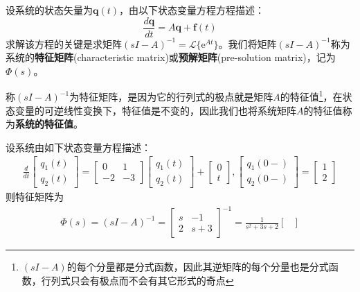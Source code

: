 \begin{definition}
    设系统的状态矢量为$\mathbf{q}(t)$，由以下状态变量方程方程描述：
    $$\frac{d\mathbf{q}}{dt}=A\mathbf{q}+\mathbf{f}(t)$$
    求解该方程的关键是求矩阵$(sI-A)^{-1}=\mathcal{L}\{\mathrm{e}^{At}\}$。我们将矩阵$(sI-A)^{-1}$称为系统的\textbf{特征矩阵}(characteristic matrix)或\textbf{预解矩阵}(pre-solution matrix)，记为$\Phi(s)$。
\end{definition}

称$(sI-A)^{-1}$为特征矩阵，是因为它的行列式的极点就是矩阵$A$的特征值\footnote{$(sI-A)$的每个分量都是分式函数，因此其逆矩阵的每个分量也是分式函数，行列式只会有极点而不会有其它形式的奇点}，在状态变量的可逆线性变换下，特征值是不变的，因此我们也将系统矩阵$A$的特征值称为\textbf{系统的特征值}。

\begin{example}
    设系统由如下状态变量方程描述：
    \begin{align*}
        \frac{d}{dt}\begin{bmatrix}
            q_1(t)\\
            q_2(t)
        \end{bmatrix}=\begin{bmatrix}
            0 & 1\\
            -2 & -3
        \end{bmatrix}\begin{bmatrix}
            q_1(t)\\
            q_2(t)
        \end{bmatrix}+\begin{bmatrix}
            0\\
            t
        \end{bmatrix},\begin{bmatrix}
            q_1(0-)\\
            q_2(0-)
        \end{bmatrix}=\begin{bmatrix}
            1\\
            2
        \end{bmatrix}
    \end{align*}
    则特征矩阵为\begin{align*}
        \Phi(s)=(sI-A)^{-1}=\begin{bmatrix}
            s & -1\\
            2 & s+3
        \end{bmatrix}^{-1}=\frac{1}{s^2+3s+2}\begin{bmatrix}

\end{bmatrix}
\end{align*}
\end{example}
